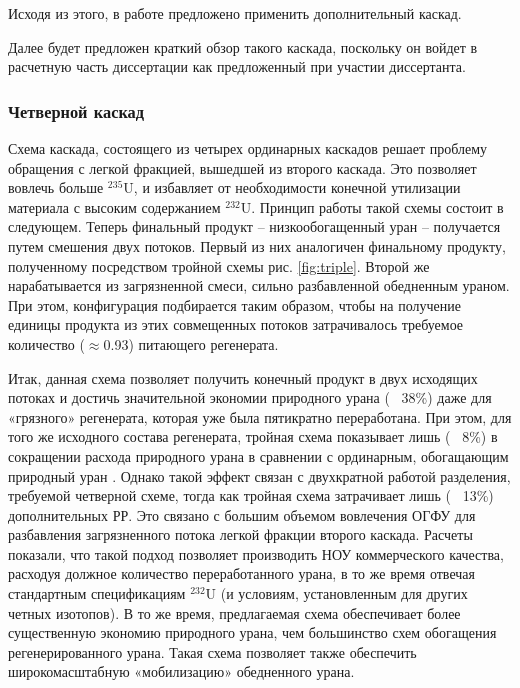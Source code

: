 Исходя из этого, в работе \cite{smirnovMethodEnrichReprocessed2019} предложено применить дополнительный каскад.

Далее будет предложен краткий обзор такого каскада, поскольку он войдет в расчетную часть диссертации как предложенный при участии диссертанта.

\subsubsection{Четверной каскад}

Схема каскада, состоящего из четырех ординарных каскадов решает проблему обращения с легкой фракцией, вышедшей из второго каскада.
Это позволяет вовлечь больше $^{235}$U, и избавляет от необходимости конечной утилизации материала с высоким содержанием $^{232}$U.
Принцип работы такой схемы состоит в следующем.
Теперь финальный продукт -- низкообогащенный уран -- получается путем смешения двух потоков.
Первый из них аналогичен финальному продукту, полученному посредством тройной схемы рис. \ref{fig:triple}.
Второй же нарабатывается из загрязненной смеси, сильно разбавленной обедненным ураном.
При этом, конфигурация подбирается таким образом, чтобы на получение единицы продукта из этих совмещенных потоков затрачивалось требуемое количество ($\approx$0.93) питающего регенерата.

Итак, данная схема позволяет получить конечный продукт в двух исходящих потоках и достичь значительной экономии природного урана (~ 38\%) даже для «грязного» регенерата, которая уже была пятикратно переработана.
При этом, для того же исходного состава регенерата, тройная схема показывает лишь (~ 8\%) в сокращении расхода природного урана в сравнении с ординарным, обогащающим природный уран \cite{smirnovObogashchenieRegenerirovannogoUrana2018}.
Однако такой эффект связан с двухкратной работой разделения, требуемой четверной схеме, тогда как тройная схема затрачивает лишь (~ 13\%) дополнительных РР.
Это связано с большим объемом вовлечения ОГФУ для разбавления загрязненного потока легкой фракции второго каскада.
Расчеты показали, что такой подход позволяет производить НОУ коммерческого качества, расходуя должное количество переработанного урана, в то же время отвечая стандартным спецификациям $^{232}$U (и условиям, установленным для других четных изотопов).
В то же время, предлагаемая схема обеспечивает более существенную экономию природного урана, чем большинство схем обогащения регенерированного урана.
Такая схема позволяет также обеспечить широкомасштабную «мобилизацию» обедненного урана.

